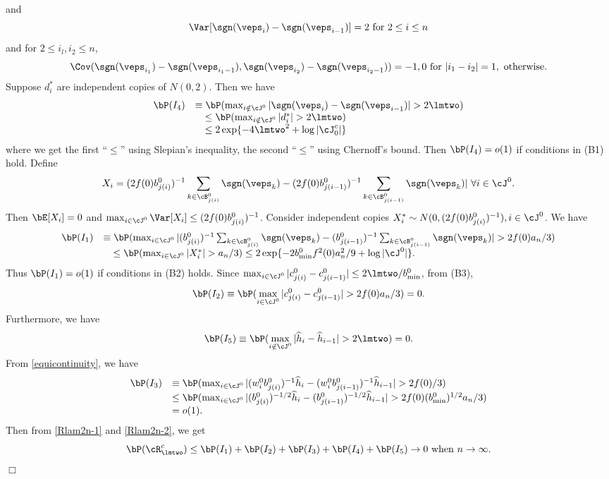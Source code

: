 \documentclass[12pt]{article}
\begin{document}
  and $$\Var[\sgn(\veps_i)-\sgn(\veps_{i-1})]=2 ~{\rm for ~}2\le i\le n$$
  and for $2\le i_l, i_2 \le n$,
   $$\Cov(\sgn(\veps_{i_1})-\sgn(\veps_{{i_1}-1}), \sgn(\veps_{i_2})-\sgn(\veps_{{i_2}-1}) )=-1, 0~{\rm for~} |{i_1}-{i_2}|=1, ~{\rm otherwise}.$$
Suppose $d_i^*$ are independent copies of $N(0,2)$.
Then we have
  $$\begin{array}{ll}
  \bP(I_4)&\equiv \bP(\max_{i\notin \cJ^0} |\sgn(\veps_i)-\sgn(\veps_{i-1})|>2\lmtwo)\\
   &\quad\le \bP(\max_{i\notin \cJ^0}|d_i^*|> 2\lmtwo)\\
   &\quad\le 2\exp\{-4\lmtwo^2+\log|\cJ_0^c|\}
   \end{array}
  $$
  where we get the first ``$ \le $''  using Slepian's inequality, the second  ``$\le$''
  using Chernoff's bound.
  Then $\bP(I_4)=o(1)$  if conditions in (B1) hold.
   Define
   $$X_i=(2f(0)b_{j(i)}^0)^{-1}\sum_{k\in \cB^0_{j(i)}} \sgn(\veps_k)-(2f(0)b_{j(i-1)}^0)^{-1}\sum_{k\in \cB^0_{j(i-1)}} \sgn(\veps_k)| ~\forall i\in \cJ^0.$$
    Then $\bE[X_i]=0$ and
    $\max_{i\in \cJ^0}\Var[X_i]\le (2f(0)b_{j(i)}^0)^{-1}$.
    Consider independent copies $X_i^*\sim N(0, (2f(0)b_{j(i)}^0)^{-1} ), i\in \cJ^0$. We have
    $$
    \begin{array}{ll}
 \bP(I_1)&\equiv \bP(\max_{i\in \cJ^0}|(b_{j(i)}^0)^{-1}\sum_{k\in \cB^0_{j(i)}} \sgn(\veps_k)-
  (b_{j(i-1)}^0)^{-1}\sum_{k\in \cB^0_{j(i-1)}} \sgn(\veps_k)|>2f(0)a_n/3)\\
  &\quad \le \bP(\max_{i\in \cJ^0}|X_i^*|>a_n/3)\le 2\exp\{-2b^0_{\min}f^2(0)a_n^2/9+\log|\cJ^0|\}.
  \end{array}
$$
Thus $\bP(I_1)=o(1)$ if conditions in (B2) holds.
Since  $\max_{i\in \cJ^0}|c_{j(i)}^0-c_{j(i-1)}^0| \le 2\lmtwo /b_{\min}^0$,
from (B3),
$$
\bP(I_2)\equiv \bP(\max_{i\in \cJ^0}|c_{j(i)}^0-c_{j(i-1)}^0|> 2f(0) a_n/3)=0.
$$
 Furthermore, we have $$
\bP(I_5)\equiv \bP( \max_{i\notin \cJ^0} |\widehat h_i-\widehat h_{i-1}|>2\lmtwo)=0.
 $$
From \eqref{equicontinuity}, we have
$$
    \begin{array}{ll}
\bP(I_3)&\equiv \bP(\max_{i\in \cJ^0} |(w_i^0b_{j(i)}^0)^{-1}\widehat h_{i}-(w_i^0b_{j(i-1)}^0)^{-1}\widehat h_{i-1}|> 2f(0)/3)\\
&\le \bP(\max_{i\in \cJ^0} |(b_{j(i)}^0)^{-1/2}\widehat h_{i}-(b_{j(i-1)}^0)^{-1/2}\widehat h_{i-1}|> 2f(0)(b_{\min}^0)^{1/2}a_n/3)\\
&=o(1).
 \end{array}
$$
Then from \eqref{Rlam2n-1} and \eqref{Rlam2n-2}, we get
$$
\bP(\cR_{\lmtwo}^c)\le \bP(I_1)+\bP(I_2)+\bP(I_3)+\bP(I_4)+\bP(I_5) \to 0 ~{\rm when~} n\to \infty.
$$
 $\Box$
\end{document}
